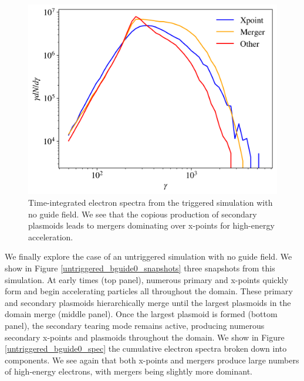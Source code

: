 \documentclass[iop,twocolappendix]{emulateapj}
\begin{document}
\begin{figure}[htp]
	
	\includegraphics[width=\linewidth]{8k_bguide0_triggered_accmec_spect.png}
	\caption{Time-integrated electron spectra from the triggered simulation with no guide field.  We see that the copious production of secondary plasmoids leads to mergers dominating over x-points for high-energy acceleration.}
	\label{triggered_bguide0_spec}
\end{figure}

We finally explore the case of an untriggered simulation with no guide field.  We show in Figure \ref{untriggered_bguide0_snapshots} three snapshots from this simulation.  At early times (top panel), numerous primary and x-points quickly form and begin accelerating particles all throughout the domain.  These primary and secondary plasmoids hierarchically merge until the largest plasmoids in the domain merge (middle panel).  Once the largest plasmoid is formed (bottom panel), the secondary tearing mode remains active, producing numerous secondary x-points and plasmoids throughout the domain.  We show in Figure \ref{untriggered_bguide0_spec} the cumulative electron spectra broken down into components.  We see again that both x-points and mergers produce large numbers of high-energy electrons, with mergers being slightly more dominant.
\end{document}
